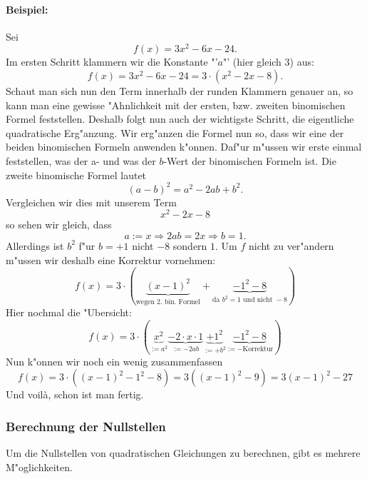 \paragraph{Beispiel:}
Sei 
\begin{equation*}
f(x) = 3x^2 - 6x - 24.
\end{equation*}
Im ersten Schritt klammern wir die Konstante "'$a$"' (hier gleich $3$) aus:
\begin{equation*}
f(x) = 3x^2 - 6x - 24= 3 \cdot (x^2-2x-8).
\end{equation*}
Schaut man sich nun den Term innerhalb der runden Klammern genauer an, so kann man eine gewisse "Ahnlichkeit mit der ersten, bzw. zweiten binomischen Formel feststellen. Deshalb folgt nun auch der wichtigste Schritt, die eigentliche quadratische Erg"anzung. Wir erg"anzen die Formel nun so, dass wir eine der beiden binomischen Formeln anwenden k"onnen. Daf"ur m"ussen wir erste einmal feststellen, was der a- und was der $b$-Wert der binomischen Formeln ist. Die zweite binomische Formel lautet 
\begin{equation*}
(a-b)^2=a^2-2ab+b^2.
\end{equation*}
Vergleichen wir dies mit unserem Term 
\begin{equation*}
x^2-2x-8
\end{equation*}
so sehen wir gleich, dass
\begin{equation*}
a := x \Rightarrow 2ab = 2x \Rightarrow b = 1.
\end{equation*}
Allerdings ist $b^2$ f"ur $b = +1$ nicht $-8$ sondern $1$. Um $f$ nicht zu ver"andern m"ussen wir deshalb eine Korrektur vornehmen:
\begin{equation*}
f(x) = 3 \cdot \left(  \underbrace{(x-1)^2}_{\text{wegen 2. bin. Formel}} + \underbrace{-1^2 - 8}_{\text{da } b^2 = 1 \text{ und nicht } -8 } \right)
\end{equation*}
Hier nochmal die "Ubersicht:
\begin{equation*}
f(x) = 3 \cdot \left(  \underbrace{x^2}_{:=a^2} \underbrace{- 2 \cdot x \cdot 1}_{:= -2ab} \underbrace{+ 1^2}_{:= + b^2} \underbrace{- 1^2 -8}_{:=-\text{Korrektur}} \right)
\end{equation*} 
Nun k"onnen wir noch ein wenig zusammenfassen
\begin{equation*}
f(x) = 3 \cdot ((x-1)^2-1^2-8) = 3((x-1)^2-9) = 3(x-1)^2-27
\end{equation*}
Und voil\`a, schon ist man fertig.

\subsubsection{Berechnung der Nullstellen}
Um die Nullstellen von quadratischen Gleichungen zu berechnen, gibt es mehrere M"oglichkeiten.

